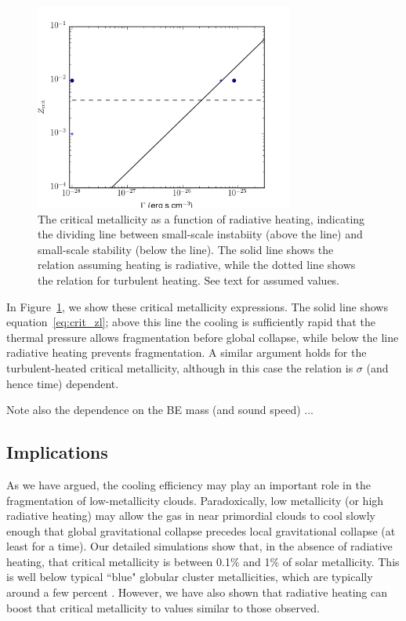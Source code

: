 \documentclass[useAMS,usenatbib]{mn2e}
\begin{document}
\begin{figure}
\begin{center}
\includegraphics[width=8.5cm]{heating_cooling/Zcrit.png}
\end{center}
\caption{\label{fig:zcrit} The critical metallicity as a function of radiative heating, indicating the dividing line between small-scale instabiity (above the line) and small-scale stability (below the line).  The solid line shows the relation assuming heating is radiative, while the dotted line shows the relation for turbulent heating.  See text for assumed values.  }
\end{figure}

In Figure~\ref{fig:zcrit}, we show these critical metallicity expressions.  The solid line shows equation~\ref{eq:crit_zl}; above this line the cooling is sufficiently rapid that the thermal pressure allows fragmentation before global collapse, while below the line radiative heating prevents fragmentation.  A similar argument holds for the turbulent-heated critical metallicity, although in this case the relation is $\sigma$ (and hence time) dependent.

Note also the dependence on the BE mass (and sound speed) ...


\subsection{Implications}

As we have argued, the cooling efficiency may play an important role in the fragmentation of low-metallicity clouds.  Paradoxically, low metallicity (or high radiative heating) may allow the gas in near primordial clouds to cool slowly enough that global gravitational collapse precedes local gravitational collapse (at least for a time).  Our detailed simulations show that, in the absence of radiative heating, that critical metallicity is between 0.1\% and 1\% of solar metallicity.  This is well below typical ``blue" globular cluster metallicities, which are typically around a few percent \citep{West2004}.  However, we have also shown that radiative heating can boost that critical metallicity to values similar to those observed.  
\end{document}
